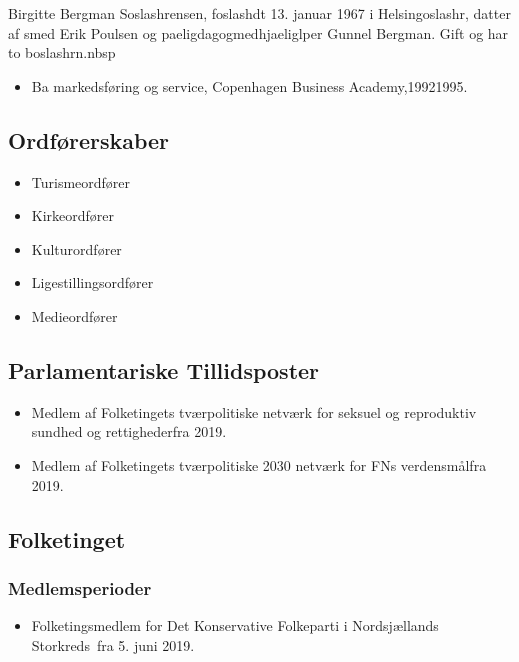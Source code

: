 \documentclass[11pt, a4paper]{awesome-cv}
\begin{document}
\makecvheader[R]
\makelettertitle
\begin{cvletter}
Birgitte Bergman Soslashrensen, foslashdt 13. januar 1967 i Helsingoslashr, datter af smed Erik Poulsen og paeligdagogmedhjaeliglper Gunnel Bergman. Gift og har to boslashrn.nbsp

\begin{itemize}
\item Ba markedsføring og service, Copenhagen Business Academy,19921995.
\end{itemize}
\subsection*{Ordførerskaber}
\begin{itemize}
\item Turismeordfører
\item Kirkeordfører
\item Kulturordfører
\item Ligestillingsordfører
\item Medieordfører
\end{itemize}
\subsection*{Parlamentariske Tillidsposter}
\begin{itemize}
\item Medlem af Folketingets tværpolitiske netværk for seksuel og reproduktiv sundhed og rettighederfra 2019.
\item Medlem af Folketingets tværpolitiske 2030 netværk for FNs verdensmålfra 2019.
\end{itemize}
\subsection*{Folketinget}
\subsubsection*{Medlemsperioder}
\begin{itemize}
\item Folketingsmedlem for Det Konservative Folkeparti i Nordsjællands Storkreds fra 5. juni 2019.
\end{itemize}

\end{cvletter}
\end{document}
